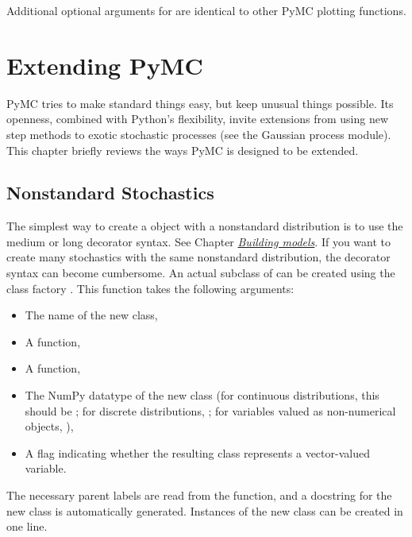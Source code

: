 \documentclass[letterpaper,10pt,english]{sphinxmanual}
\begin{document}
Additional optional arguments for  are identical to other PyMC plotting functions.


\chapter{Extending PyMC}
\label{extending:chap-extending}\label{extending::doc}\label{extending:extending-pymc}
PyMC tries to make standard things easy, but keep unusual things possible. Its openness, combined with Python's flexibility, invite extensions from using new step methods to exotic stochastic processes (see the Gaussian process module). This chapter briefly reviews the ways PyMC is designed to be extended.


\section{Nonstandard Stochastics}
\label{extending:nonstandard-stochastics}\label{extending:nonstandard}
The simplest way to create a  object with a nonstandard distribution is to use the medium or long decorator syntax. See Chapter {\hyperref[modelbuilding:chap-modelbuilding]{\emph{Building models}}}. If you want to create many stochastics with the same nonstandard distribution, the decorator syntax can become cumbersome. An actual subclass of  can be created using the class factory . This function takes the following arguments:
\begin{itemize}
\item {} 
The name of the new class,

\item {} 
A  function,

\item {} 
A  function,

\item {} 
The NumPy datatype of the new class (for continuous distributions, this should be ; for discrete distributions, ; for variables valued as non-numerical objects, ),

\item {} 
A flag indicating whether the resulting class represents a vector-valued variable.

\end{itemize}

The necessary parent labels are read from the  function, and a docstring for the new class is automatically generated. Instances of the new class can be created in one line.
\end{document}
